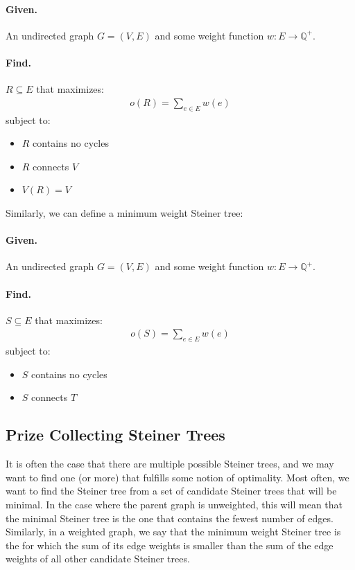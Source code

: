 \documentclass[12pt,twoside]{reedthesis}
\theoremstyle{definition}
\begin{document}
 \hfill\begin{minipage}{\dimexpr\textwidth-2cm}
 \paragraph{Given.}An undirected graph $G=(V,E)$ and some weight function $w:E \rightarrow \mathbb{Q}^+$.
 \paragraph{Find.}$R \subseteq E$ that maximizes:
 \begin{align*}
  o(R)=\sum_{e \in E}w(e)
 \end{align*}
 subject to:
 \begin{itemize}
   \item{$R$ contains no cycles}
   \item{$R$ connects $V$}
   \item{$V(R) = V$}
 \end{itemize}
\xdef\tpd{\the\prevdepth}
\end{minipage}

Similarly, we can define a minimum weight Steiner tree:

 \bigbreak

 \hfill\begin{minipage}{\dimexpr\textwidth-2cm}
 \paragraph{Given.}An undirected graph $G=(V,E)$ and some weight function $w:E \rightarrow \mathbb{Q}^+$.
 \paragraph{Find.}$S \subseteq E$ that maximizes:
 \begin{align*}
  o(S)=\sum_{e \in E}w(e)
 \end{align*}
 subject to:
 \begin{itemize}
   \item{$S$ contains no cycles}
   \item{$S$ connects $T$}
 \end{itemize}
\xdef\tpd{\the\prevdepth}
\end{minipage}


  \subsection{Prize Collecting Steiner Trees}
  It is often the case that there are multiple possible Steiner trees, and we may want to find one (or more) that fulfills some notion of optimality. Most often, we want to find the Steiner tree from a set of candidate Steiner trees that will be minimal. In the case where the parent graph is unweighted, this will mean that the minimal Steiner tree is the one that contains the fewest number of edges. Similarly, in a weighted graph, we say that the minimum weight Steiner tree is the for which the sum of its edge weights is smaller than the sum of the edge weights of all other candidate Steiner trees.\par
\end{document}
